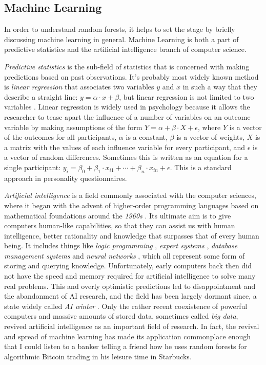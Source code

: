\documentclass[a4paper,man,12pt,apacite,floatsintext,draftfirst]{apa6} %
\begin{document}
\subsection{Machine Learning}
In order to understand random forests, it helps to set
the stage by briefly discussing machine learning in general.
Machine Learning is both a part of predictive statistics and the
artificial intelligence branch of computer science.

\emph{Predictive statistics} is the sub-field of statistics that is
concerned with making predictions based on past observations.
It's probably most widely known method is \emph{linear regression}
that associates two variables \(y\) and \(x\) in such a way
that they describe a straight line: \(y = \alpha \cdot x + \beta \), but
linear regression is not limited to two variables \cite{borzlinreg}.
Linear regression is widely used in psychology because it
allows the researcher to tease apart the influence of a number of variables on an
outcome variable by making assumptions of the form
\( Y = \alpha + \beta \cdot X + \epsilon \), where \(Y\) is a vector of
the outcomes for all participants, \(\alpha\) is a constant,
\(\beta\) is a vector of weights, \(X\) is a matrix with the values of each influence variable for
every participant, and \(\epsilon\) is a vector of random differences.
Sometimes this is written as an equation for a single participant:
\( y_{i} = \beta_{0} + \beta_{1} \cdot x_{i1} + \dotsb + \beta_{n} \cdot x_{in} + \epsilon \).
This is a standard approach in personality questionnaires.

\emph{Artificial intelligence} is a field commonly associated with the
computer sciences, where it began with the advent of higher-order
programming languages based on mathematical foundations around the \emph{1960s} \cite{wpHOPL}.
Its ultimate aim is to give computers human-like capabilities,
so that they can assist us with human intelligence, better rationality
and knowledge that surpasses that of every human being.
It includes things like \emph{logic programming} \cite{wpLP, qai},
\emph{expert systems} \cite{wpES, qai}, \emph{database management systems} \cite{wpDB} and
\emph{neural networks} \cite{haykin, qai}, which all represent some form of
storing and querying knowledge.
Unfortunately, early computers back then did not have the speed and memory
required for artificial intelligence to solve many real problems.
This and overly optimistic predictions led to disappointment and the abandonment of AI research,
and the field has been largely dormant since, a state widely called \emph{AI winter} \cite{qai, wpHOAI}.
Only the rather recent coexistence of powerful computers and massive amounts
of stored data, sometimes called \emph{big data}, revived artificial
intelligence as an important field of research.
In fact, the revival and spread of machine learning has made its application
commonplace enough that I could listen to a banker telling a friend how
he uses random forests for algorithmic Bitcoin trading in his leisure time
in Starbucks.
\end{document}
